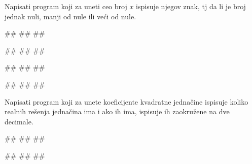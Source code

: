 \begin{Exercise}[label=v1.2_03] 
Napisati program koji za uneti ceo broj $x$ ispisuje njegov znak, tj da li je broj jednak nuli, manji od nule ili veći od nule.

\begin{miditest}
\begin{upotreba}{1}
#\naslovInt#
##
##
\end{upotreba}
\end{miditest}
\begin{miditest}
\begin{upotreba}{2}
#\naslovInt#
##
##
\end{upotreba}
\end{miditest}

\begin{miditest}
\begin{upotreba}{3}
#\naslovInt#
##
##
\end{upotreba}
\end{miditest}
\begin{miditest}
\begin{upotreba}{4}
#\naslovInt#
##
##
\end{upotreba}
\end{miditest}

\end{Exercise}
\ifresenja
 \begin{Answer}[ref=v1.2_03]
\end{Answer}
\fi


\begin{Exercise}[label=v1.2_07] 
Napisati program koji za unete koeficijente kvadratne jednačine ispisuje koliko realnih rešenja jednačina ima i ako ih ima, ispisuje ih zaokružene na dve decimale.

\begin{miditest}
\begin{upotreba}{1}
#\naslovInt#
##
##
\end{upotreba}
\end{miditest}
\begin{miditest}
\begin{upotreba}{2}
#\naslovInt#
##
##
\end{upotreba}
\end{miditest}

\end{Exercise}
\ifresenja
 \begin{Answer}[ref=v1.2_07]
\end{Answer}
\fi

